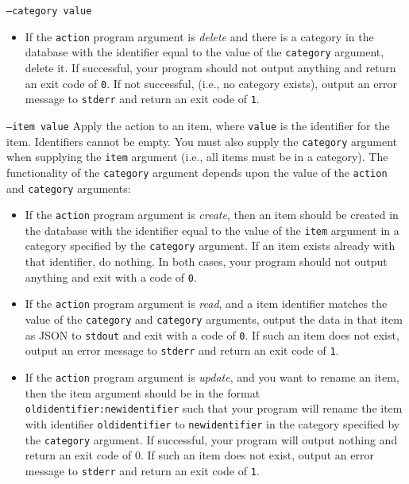 \documentclass[a4paper]{article}
\begin{document}
\begin{labeling}{ \texttt{--category value} }
\begin{itemize}
        \item If the \texttt{action} program argument is \emph{delete} and there is a category in the database with the identifier equal to the value of the \texttt{category} argument, delete it. If successful, your program should not output anything and return an exit code of \texttt{0}. If not successful, (i.e., no category exists), output an error message to \texttt{stderr} and return an exit code of \texttt{1}.
        \end{itemize}
    
    \item[\texttt{--item value}]
    Apply the action to an item, where \texttt{value} is the identifier for the item. Identifiers cannot be empty. You must also supply the \texttt{category} argument when supplying the \texttt{item} argument (i.e., all items must be in a category). The functionality of the \texttt{category} argument depends upon the value of the \texttt{action} and \texttt{category} arguments:
        \begin{itemize}
    
        \item If the \texttt{action} program argument is \emph{create}, then an item should be created in the database with the identifier equal to the value of the \texttt{item} argument in a category specified by the \texttt{category} argument. If an item exists already with that identifier, do nothing. In both cases, your program should not output anything and exit with a code of \texttt{0}.
    
        \item If the \texttt{action} program argument is \emph{read}, and a item identifier matches the value of the \texttt{category} and \texttt{category} arguments, output the data in that item as JSON to \texttt{stdout} and exit with a code of \texttt{0}. If such an item does not exist, output an error message to \texttt{stderr} and return an exit code of \texttt{1}.
    
        \item If the \texttt{action} program argument is \emph{update}, and you want to rename an item, then the item argument should be in the format \\\texttt{oldidentifier:newidentifier} such that your program will rename the item with identifier \texttt{oldidentifier} to \texttt{newidentifier} in the category specified by the \texttt{category} argument. If successful, your program will output nothing and return an exit code of 0. If such an item does not exist, output an error message to \texttt{stderr} and return an exit code of \texttt{1}.
    

\end{itemize}
\end{labeling}
\end{document}
